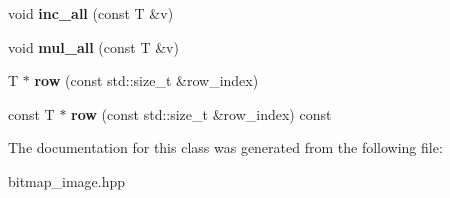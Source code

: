 \begin{DoxyCompactItemize}
void {\bfseries inc\+\_\+all} (const T \&v)
\item 
\mbox{\label{classresponse__image_a3c3ba7a842ccfd4a6248044c5b457077}} 
void {\bfseries mul\+\_\+all} (const T \&v)
\item 
\mbox{\label{classresponse__image_a1ad6876fdac6f851a7b75e992b8678dd}} 
T $\ast$ {\bfseries row} (const std\+::size\+\_\+t \&row\+\_\+index)
\item 
\mbox{\label{classresponse__image_a456ae3e838214ae89eb0e5dbb544cd2c}} 
const T $\ast$ {\bfseries row} (const std\+::size\+\_\+t \&row\+\_\+index) const
\end{DoxyCompactItemize}


The documentation for this class was generated from the following file\+:\begin{DoxyCompactItemize}
\item 
bitmap\+\_\+image.\+hpp\end{DoxyCompactItemize}
